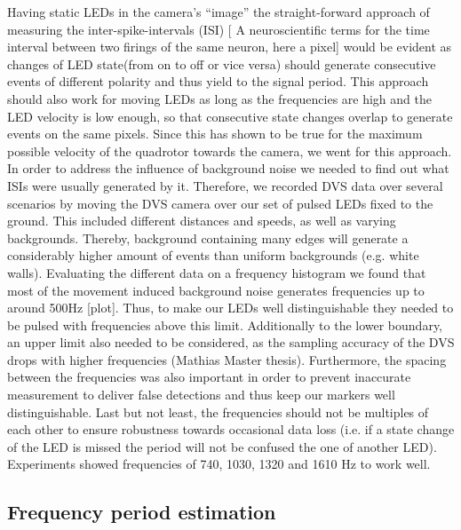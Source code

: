 Having static LEDs in the camera’s “image” the straight-forward approach of measuring the inter-spike-intervals  (ISI) [ A neuroscientific terms for the time interval between two firings of the same neuron, here a pixel] would be evident as changes of LED state(from on to off or vice versa) should generate consecutive events of different polarity  and thus yield to the signal period. This approach should also work for moving LEDs as long as the frequencies are high and the LED velocity is low enough, so that consecutive state changes overlap to generate events on the same pixels. Since this has shown to be true for the maximum possible velocity of the quadrotor towards the camera, we went for this approach.
In order to address the influence of background noise we needed to find out what ISIs were usually generated by it. Therefore, we recorded DVS data over several scenarios by moving the DVS camera over our set of pulsed LEDs fixed to the ground. This included different distances and speeds, as well as varying backgrounds. Thereby, background containing many edges will generate a considerably higher amount of events than uniform backgrounds (e.g. white walls). Evaluating the different data on a frequency histogram we found that most of the movement induced background noise generates frequencies up to around 500Hz [plot]. Thus, to make our LEDs well distinguishable they needed to be pulsed with frequencies above this limit. Additionally to the lower boundary, an upper limit also needed to be considered, as the sampling accuracy of the DVS drops with higher frequencies (Mathias Master thesis). Furthermore, the spacing between the frequencies was also important in order to prevent inaccurate measurement to deliver false detections and thus keep our markers well distinguishable. Last but not least, the frequencies should not be multiples of each other to ensure robustness towards occasional data loss (i.e. if a state change of the LED is missed the period will not be confused the one of another LED). Experiments showed frequencies of 740, 1030, 1320 and 1610 Hz to work well.


\subsection{Frequency period estimation}\label{sec:periodestimation}


